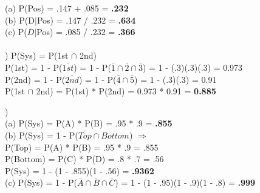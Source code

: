 \documentclass[12pt]{article}
\begin{document}
\indent (a) P(Pos) = .147 + .085 = \textbf{.232}\\
\indent (b) P(D$|$Pos) = .147 / .232 = \textbf{.634}\\
\indent (c) P($\overline{D}|$Pos) = .085 / .232 = \textbf{.366}\\


\noindent \hrulefill \\


) P(Sys) = P(1st $\cap$ 2nd) \\
\indent P(1st) = 1 - P($\overline{1st}$) = 1 - P($\overline{1} \cap \overline{2} \cap \overline{3}$) = 1 - (.3)(.3)(.3) = 0.973\\
\indent P(2nd) = 1 - P($\overline{2nd}$) = 1 - P($\overline{4} \cap \overline{5}$) = 1 - (.3)(.3) = 0.91\\
\indent P(1st $\cap$ 2nd) = P(1st) * P(2nd) = 0.973 * 0.91 = \textbf{0.885}\\


\noindent \hrulefill 
\pagebreak


)\\
\indent (a) P(Sys) = P(A) * P(B) = .95 * .9 = \textbf{.855}\\

\indent (b) P(Sys) = 1 - P($\overline{Top} \cap \overline{Bottom}$) $\Rightarrow$\\
\indent \indent P(Top) = P(A) * P(B) = .95 * .9 = .855\\
\indent \indent P(Bottom) = P(C) * P(D) = .8 * .7 = .56\\
\indent \indent P(Sys) = 1 - (1 - .855)(1 - .56) = \textbf{.9362}\\

\indent (c) P(Sys) = 1 -  P($\overline{A} \cap \overline{B} \cap \overline{C}$) = 1 - (1 - .95)(1 - .9)(1 - .8) = \textbf{.999}
\end{document}
